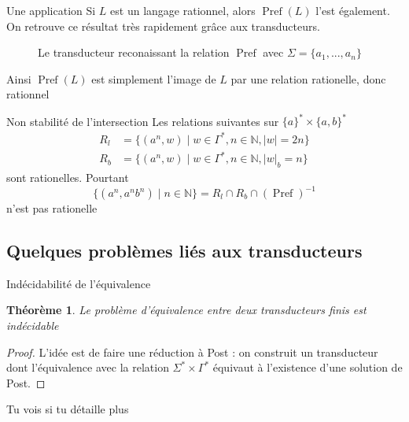 \documentclass{beamer}
\newtheorem{thm}{Théorème}
\begin{document}
\begin{frame}{Une application}
    Si $L$ est un langage rationnel, alors $\operatorname*{Pref}(L)$ l'est également. On retrouve
    ce résultat très rapidement grâce aux transducteurs.
    \begin{figure}[h]
        \caption{Le transducteur reconaissant la relation $\operatorname*{Pref}$ avec $\Sigma = \{a_1, ..., a_n\}$} \label{transPref}
        \begin{center}
        \end{center}
    \end{figure}
    Ainsi $\operatorname*{Pref}(L)$ est simplement l'image de $L$ par une relation rationelle, donc rationnel
\end{frame}

\begin{frame}{Non stabilité de l'intersection}
    Les relations suivantes sur $\{a\}^* \times \{a, b\}^*$
    \begin{equation*}
        \begin{split}
            R_{l} &= \{ (a^n, w) \mid w \in \Gamma^*, n \in \mathbb{N}, |w| = 2n \}\\
            R_{b} &= \{ (a^n, w) \mid w \in \Gamma^*, n \in \mathbb{N}, |w|_b = n \} 
        \end{split}
    \end{equation*}
    sont rationelles. Pourtant
    \[ \{ (a^n, a^nb^n) \mid n \in \mathbb{N} \} = R_l \cap R_b \cap (\operatorname*{Pref})^{-1}\]
    n'est pas rationelle
\end{frame}

\subsection{Quelques problèmes liés aux transducteurs}

\begin{frame}{Indécidabilité de l'équivalence}
    \begin{thm}
        Le problème d'équivalence entre deux transducteurs finis est indécidable
    \end{thm}
    \begin{proof}
        L'idée est de faire une réduction à Post : on construit un transducteur dont l'équivalence
        avec la relation $\Sigma^* \times \Gamma^*$ équivaut à l'existence d'une solution de Post.
    \end{proof}
    Tu vois si tu détaille plus
\end{frame}
\end{document}
